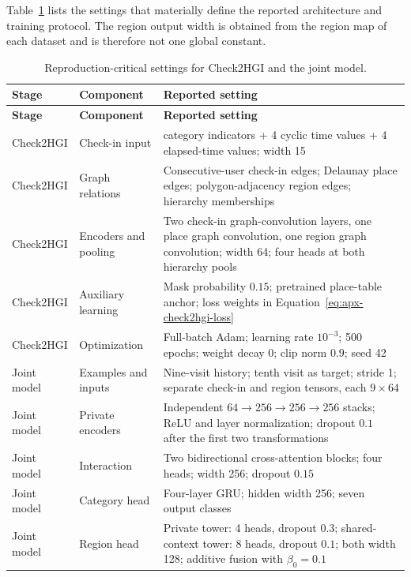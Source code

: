 Table~\ref{tab:apx-active-settings} lists the settings that materially define the
reported architecture and training protocol. The region output width is obtained
from the region map of each dataset and is therefore not one global constant.

{\small
\begin{longtable}{>{\raggedright\arraybackslash}p{}
                  >{\raggedright\arraybackslash}p{}
                  >{\raggedright\arraybackslash}p{}}
\caption{Reproduction-critical settings for Check2HGI and the joint model.}
\label{tab:apx-active-settings}\\
\toprule
\textbf{Stage} & \textbf{Component} & \textbf{Reported setting} \\
\midrule
\endfirsthead
\toprule
\textbf{Stage} & \textbf{Component} & \textbf{Reported setting} \\
\midrule
\endhead
Check2HGI & Check-in input & 7 category indicators + 4 cyclic time values + 4 elapsed-time values; width 15 \\
Check2HGI & Graph relations & Consecutive-user check-in edges; Delaunay place edges; polygon-adjacency region edges; hierarchy memberships \\
Check2HGI & Encoders and pooling & Two check-in graph-convolution layers, one place graph convolution, one region graph convolution; width 64; four heads at both hierarchy pools \\
Check2HGI & Auxiliary learning & Mask probability $0.15$; pretrained place-table anchor; loss weights in Equation~\ref{eq:apx-check2hgi-loss} \\
Check2HGI & Optimization & Full-batch Adam; learning rate $10^{-3}$; 500 epochs; weight decay 0; clip norm $0.9$; seed 42 \\
Joint model & Examples and inputs & Nine-visit history; tenth visit as target; stride 1; separate check-in and region tensors, each $9\times64$ \\
Joint model & Private encoders & Independent $64\rightarrow256\rightarrow256\rightarrow256$ stacks; ReLU and layer normalization; dropout $0.1$ after the first two transformations \\
Joint model & Interaction & Two bidirectional cross-attention blocks; four heads; width 256; dropout $0.15$ \\
Joint model & Category head & Four-layer GRU; hidden width 256; seven output classes \\
Joint model & Region head & Private tower: 4 heads, dropout $0.3$; shared-context tower: 8 heads, dropout $0.1$; both width 128; additive fusion with $\beta_0=0.1$ \\

\end{longtable}}
